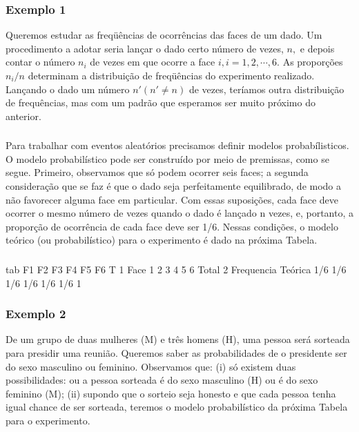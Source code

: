 \documentclass[14pt,aspectratio=1610]{beamer}
\begin{document}
\begin{frame}{}
\frametitle{Exemplo 1}
\begin{block}{}
\justifying
Queremos estudar as freqüências de ocorrências das faces de um dado. Um procedimento a adotar seria lançar o dado certo número de vezes, $n,$ e depois contar o número $n_{i}$ de vezes em que ocorre a face $i, i = 1, 2,\cdots, 6.$ As proporções $n_{i}/n$
determinam a distribuição de freqüências do experimento realizado. Lançando o dado
um número $n'(n'\neq n)$ de vezes, teríamos outra distribuição de frequências, mas com um padrão que esperamos ser muito próximo do anterior.

\end{block}
\end{frame}

\begin{frame}{}
\frametitle{}
\begin{block}{}
\justifying
Para trabalhar com eventos aleatórios precisamos definir modelos probabílisticos. O modelo probabilístico pode ser construído por meio de premissas, como se segue.
Primeiro, observamos que só podem ocorrer seis faces; a segunda consideração que
se faz é que o dado seja perfeitamente equilibrado, de modo a não favorecer alguma face em particular. Com essas suposições, cada face deve ocorrer o mesmo número de vezes quando o dado é lançado n vezes, e, portanto, a proporção de ocorrência de cada face deve ser 1/6. Nessas condições, o modelo teórico (ou probabilístico) para o experimento é dado na próxima Tabela.
\end{block}
\end{frame}

\begin{frame}[fragile]{}
\frametitle{}
\begin{block}{}
\justifying
\begin{Schunk}
\begin{Soutput}
                 tab  F1  F2  F3  F4  F5  F6     T
1               Face   1   2   3   4   5   6 Total
2 Frequencia Teórica 1/6 1/6 1/6 1/6 1/6 1/6     1
\end{Soutput}
\end{Schunk}

\end{block}
\end{frame}

\begin{frame}{}
\frametitle{Exemplo 2}
\begin{block}{}
\justifying
De um grupo de duas mulheres (M) e três homens (H), uma pessoa será sorteada para presidir uma reunião. Queremos saber as probabilidades de o presidente ser do sexo masculino ou feminino. Observamos que: (i) só existem duas possibilidades: ou a pessoa sorteada é do sexo masculino (H) ou é do sexo feminino (M); (ii) supondo que o sorteio seja honesto e que cada pessoa tenha igual chance de ser sorteada, teremos o modelo probabilístico da próxima Tabela para o experimento.
\end{block}
\end{frame}
\end{document}
